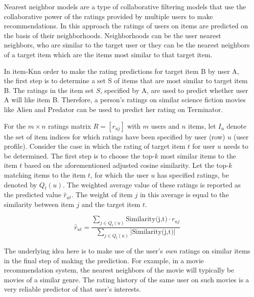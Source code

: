             Nearest neighbor models are a type of collaborative filtering models that use the collaborative power of the ratings provided by multiple users to make recommendations. In this approach the ratings of users on items are predicted on the basis of their neighborhoods. Neighborhoods can be the user nearest neighbors, who are similar to the target user or they can be the nearest neighbors of a target item which are the items most similar to that target item.
        
            In item-Knn order to make the rating predictions for target item B by user A, the first step is to determine a set S of items that are most similar to target item B. The ratings in the item set $S$, specified by A, are used to predict whether user A will like item B. Therefore, a person's ratings on similar science fiction movies like Alien and Predator can be used to predict her rating on Terminator.
    
            For the $m \times n$ ratings matrix $R = [r_{uj}]$ with $m$ users and $n$ items, let $I_u$ denote the set of item indices for which ratings have been specified by user (row) $u$ (user profile). Consider the case in which the rating of target item $t$ for user $u$ needs to be determined. The first step is to choose the top-$k$ most similar items to the item $t$ based on the aforementioned adjusted cosine similarity. Let the top-$k$ matching items to the item $t$, for which the user $u$ has specified ratings, be denoted by $Q_{t}(u)$. The weighted average value of these ratings is reported as the predicted value $\hat{r}_{ut}$. The weight of item $j$ in this average is equal to the similarity between item $j$ and the target item $t$.
        
            \begin{equation}
                \hat{r}_{ut} = \frac{\sum_{j \in Q_{t}(u)} \text{Similarity(j,t)} \cdot r_{uj}}{\sum_{j \in Q_{t}(u)} |\text{Similarity(j,t)}|}
            \end{equation}
            \vspace{0.25cm}
        
            The underlying idea here is to make use of the user’s \textit{own} ratings on similar items in the final step of making the prediction. For example, in a movie recommendation system, the nearest neighbors of the movie will typically be movies of a similar genre. The rating history of the same user on such movies is a very reliable predictor of that user's interests.
        
